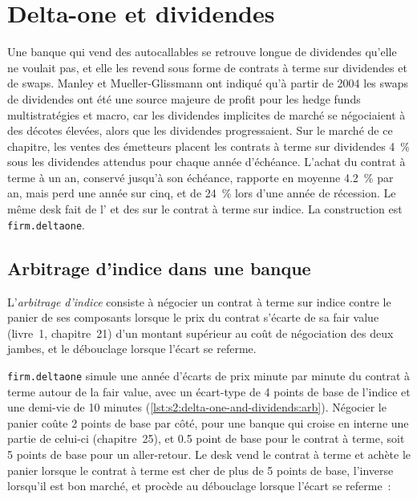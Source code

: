 \chapter{Delta-one et dividendes}\label{ch:s2:delta-one-and-dividends}

Une banque qui vend des autocallables se retrouve longue de dividendes qu'elle ne voulait pas, et elle les revend sous forme de contrats à terme sur dividendes et de swaps. Manley et Mueller-Glissmann
ont indiqué qu'à partir de 2004 les swaps de dividendes ont été une source majeure de profit pour les hedge funds multistratégies et macro, car les dividendes implicites de marché se négociaient à
des décotes élevées, alors que les dividendes progressaient. Sur le marché de ce chapitre, les ventes des émetteurs placent les contrats à terme sur dividendes 4~\% sous les dividendes attendus pour chaque année
d'échéance. L'achat du contrat à terme à un an, conservé jusqu'à son échéance, rapporte en moyenne 4.2~\% par an, mais perd une année sur cinq, et de 24~\% lors
d'une année de récession. Le même desk fait de l' et des  sur le contrat à terme sur indice. La construction est \texttt{firm.deltaone}.

\section{Arbitrage d'indice dans une banque}

\begin{definition}\label{def:s2:delta-one-and-dividends:indexarb}
L'\emph{arbitrage d'indice} consiste à négocier un contrat à terme sur indice contre le panier de ses composants lorsque le prix du contrat s'écarte de
sa fair value (livre~1, chapitre~21) d'un montant supérieur au coût de négociation des deux jambes, et le débouclage lorsque l'écart se referme.
\end{definition}

\texttt{firm.deltaone} simule une année d'écarts de prix minute par minute du contrat à terme autour de la fair value, avec un écart-type de 4 points de base
de l'indice et une demi-vie de 10 minutes (\cref{lst:s2:delta-one-and-dividends:arb}). Négocier le panier coûte 2 points de base par côté, pour une banque qui
croise en interne une partie de celui-ci (chapitre~25), et 0.5 point de base pour le contrat à terme, soit 5 points de base pour un aller-retour. Le desk vend le contrat à terme et achète le panier lorsque
le contrat à terme est cher de plus de 5 points de base, l'inverse lorsqu'il est bon marché, et procède au débouclage lorsque l'écart se referme~:

